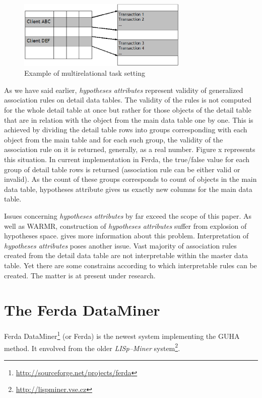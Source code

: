 \documentclass[conference]{IEEEtran}
\begin{document}
\begin{figure}[!t]
\centering
\includegraphics[width=3.2in]{Transactions.eps}
\caption{Example of multirelational task setting}
\label{fig:transactions}
\end{figure}

As we have said earlier, \emph{hypotheses attributes} represent validity of generalized 
association rules on detail data tables. The validity of the rules is not computed
for the whole detail table at once but rather for those objects of the detail
table that are in relation with the object from the main data table one by one. This is achieved by dividing the detail table rows into groups corresponding with each
object from the main table and for each such group, the validity of the association
rule on it is returned, generally, as a real number. Figure x represents this
situation. In current implementation in Ferda,
the true/false value for each group of detail table rows is returned (association rule
can be either valid or invalid). As the count of these groups corresponds to count of
objects in the main data table, hypotheses attribute gives us exactly new columns for
the main data table.

Issues concerning \emph{hypotheses attributes} by far exceed the scope of this paper.
As well as WARMR, construction of \emph{hypotheses attributes} suffer from explosion
of hypotheses space. \cite{Karban} gives more information about this problem. 
Interpretation of \emph{hypotheses attributes} poses another issue. Vast
majority of association rules created from the detail data table are not interpretable
within the master data table. Yet there are some constrains according to which
interpretable rules can be created. The matter is at present under research. 

\section{The Ferda DataMiner}
\label{section:ferda}
Ferda DataMiner\footnote{\url{http://sourceforge.net/projects/ferda}} (or Ferda)
is the newest system implementing the GUHA method\cite{GUHA1, GUHA2}.
It envolved from the older \emph{LISp--Miner} 
system\footnote{\url{http://lispminer.vse.cz}}. 
\end{document}
